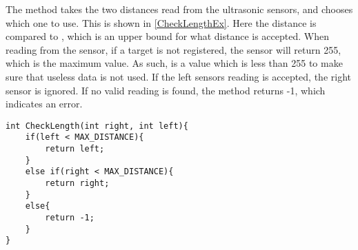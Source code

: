 The  method takes the two distances read from the ultrasonic
sensors, and chooses which one to use. This is shown in \autoref{CheckLengthEx}.
Here the distance is compared to , which is an upper bound
for what distance is accepted. When reading from the sensor, if a target is not
registered, the sensor will return 255, which is the maximum value. As such,
 is a value which is less than 255 to make sure that
useless data is not used. If the left sensors reading is accepted, the right
sensor is ignored. If no valid reading is found, the method returns -1, which
indicates an error.\nl

\begin{minipage}[H]{\linewidth}
\begin{lstlisting}[caption = CheckLength method which chooses the best input distance., label = CheckLengthEx] 
int CheckLength(int right, int left){
    if(left < MAX_DISTANCE){
        return left;
    }
    else if(right < MAX_DISTANCE){
        return right;
    }
    else{
        return -1;
    }
}
\end{lstlisting}
\end{minipage}
